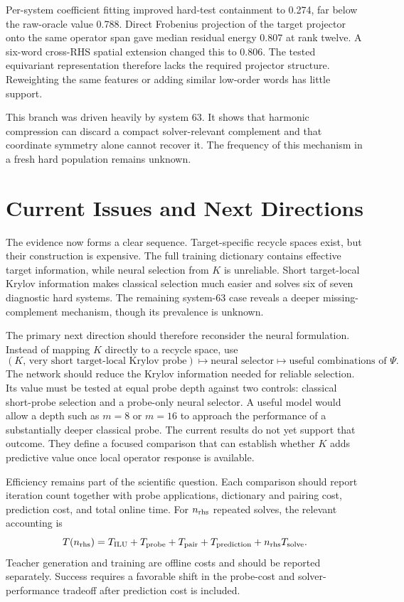 Per-system coefficient fitting improved hard-test containment to 0.274, far below the raw-oracle value 0.788. Direct Frobenius projection of the target projector onto the same operator span gave median residual energy 0.807 at rank twelve. A six-word cross-RHS spatial extension changed this to 0.806. The tested equivariant representation therefore lacks the required projector structure. Reweighting the same features or adding similar low-order words has little support.

This branch was driven heavily by system 63. It shows that harmonic compression can discard a compact solver-relevant complement and that coordinate symmetry alone cannot recover it. The frequency of this mechanism in a fresh hard population remains unknown.

\section{Current Issues and Next Directions}
\label{sec:current-issues}

The evidence now forms a clear sequence. Target-specific recycle spaces exist, but their construction is expensive. The full training dictionary contains effective target information, while neural selection from $K$ is unreliable. Short target-local Krylov information makes classical selection much easier and solves six of seven diagnostic hard systems. The remaining system-63 case reveals a deeper missing-complement mechanism, though its prevalence is unknown.

The primary next direction should therefore reconsider the neural formulation. Instead of mapping $K$ directly to a recycle space, use
\begin{equation}
 (K,\,\text{very short target-local Krylov probe})
 \longmapsto \text{neural selector}
 \longmapsto \text{useful combinations of }\Psi.
 \label{eq:next-neural-map}
\end{equation}
The network should reduce the Krylov information needed for reliable selection. Its value must be tested at equal probe depth against two controls: classical short-probe selection and a probe-only neural selector. A useful model would allow a depth such as $m=8$ or $m=16$ to approach the performance of a substantially deeper classical probe. The current results do not yet support that outcome. They define a focused comparison that can establish whether $K$ adds predictive value once local operator response is available.

Efficiency remains part of the scientific question. Each comparison should report iteration count together with probe applications, dictionary and pairing cost, prediction cost, and total online time. For $n_{\rm rhs}$ repeated solves, the relevant accounting is
\begin{equation}
 T(n_{\rm rhs})=T_{\rm ILU}+T_{\rm probe}+T_{\rm pair}
 +T_{\rm prediction}+n_{\rm rhs}T_{\rm solve}.
 \label{eq:current-cost}
\end{equation}
Teacher generation and training are offline costs and should be reported separately. Success requires a favorable shift in the probe-cost and solver-performance tradeoff after prediction cost is included.

